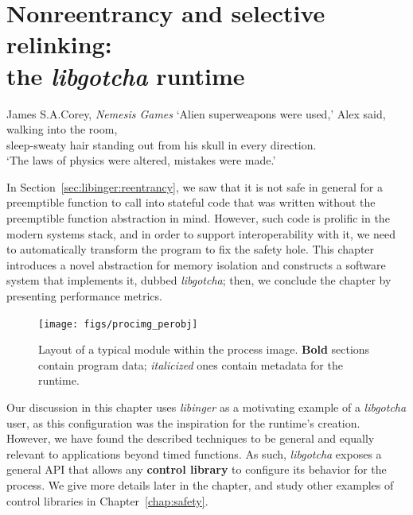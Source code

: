 \chapter{Nonreentrancy and selective relinking: \\ the \textit{libgotcha} runtime}
\label{chap:libgotcha}

\ifdefined\chapquotes
\vspace{-1in}
\begin{chapquote}[1.5in]{James S.\@ A.\@ Corey, \textit{Nemesis Games}}
`Alien superweapons were used,' Alex said, walking into the room, \\
sleep-sweaty hair standing out from his skull in every direction. \\
`The laws of physics were altered, mistakes were made.'
\end{chapquote}
\fi

In Section~\ref{sec:libinger:reentrancy}, we saw that it is not safe in general for a
preemptible function to call into stateful code that was written without the
preemptible function abstraction in mind.  However, such code is prolific in the
modern systems stack, and in order to support interoperability with it, we need to
automatically transform the program to fix the safety hole.  This chapter introduces
a novel abstraction for memory isolation and constructs a software system that
implements it, dubbed \textit{libgotcha}; then, we conclude the chapter by presenting
performance metrics.

\begin{figure}
\begin{center}
\texttt{[image: figs/procimg\_perobj]}
\end{center}
\caption[Layout of a typical module within the process image]{
Layout of a typical module within the process image.  \textbf{Bold} sections
contain program data; \textit{italicized} ones contain metadata for the runtime.}
\label{fig:procimgobj}
\end{figure}

\begin{swallowsections}

\end{swallowsections}
\hspace{-1.5em}
Our discussion in this chapter uses \textit{libinger} as a motivating example of a
\textit{libgotcha} user, as this configuration was the inspiration for the runtime's
creation.  However, we have found the described techniques to be general and
equally relevant to applications beyond timed functions.  As such,
\textit{libgotcha} exposes a general API that allows any \textbf{control library} to
configure its behavior for the process.  We give more details later in the chapter,
and study other examples of control libraries in Chapter~\ref{chap:safety}.


